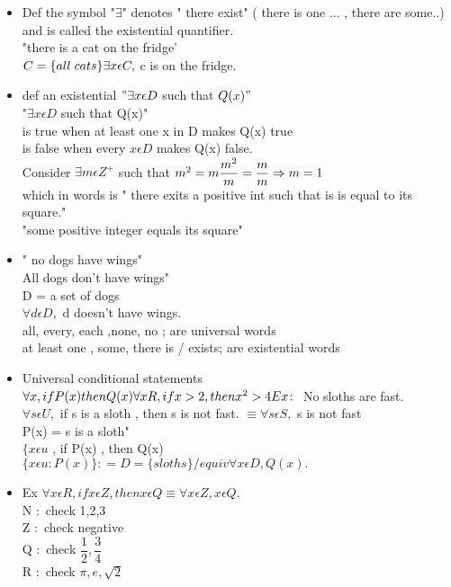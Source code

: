 \documentclass[10pt,letterpaper]{report}
\begin{document}
\begin{itemize}
\item Def the symbol "$\exists $" denotes " there exist" ( there is one ... , there are some..) and is called the existential quantifier. \\"there is a cat on the fridge' \\ $ C = \{all \; cats\} \\ \exists x \epsilon C , $ c is on the fridge. 
\item def an existential $" \exists x \epsilon D$ such that $ Q(x)"$ \\ "$ \exists x \epsilon D $ such that Q(x)" \\ is true when at least one x in D makes Q(x) true \\ is false when every $ x \epsilon D $ makes Q(x) false. \\ Consider $ \exists m \epsilon Z^+ $ such that $ m^2 = m  \\  \dfrac{m^2}{m}  = \dfrac{m}{m} \Rightarrow m = 1 $ \\ which in words is " there exits a positive int such that is is equal to its square." \\ "some positive integer equals its square"
\item " no dogs have wings" \\ All dogs don't have wings" \\ D = a set of dogs \\$ \forall d \epsilon D ,$ d doesn't have wings. \\ all, every, each ,none, no ; are universal words \\ at least one , some, there is / exists; are existential words 
\item Universal conditional statements \\ $\forall x , if P(x) then Q(x) \\ \forall x R , if x > 2, then x^2 > 4 \\ Ex \colon $ No sloths are fast. \\ $ \forall s \epsilon U ,$ if s is a sloth , then s is not fast. $\equiv  \forall s \epsilon S , $ s is not fast \\ P(x) = s is a sloth" \\ $ \{ x \epsilon u $ , if P(x) , then Q(x) \\ $ \{ x \epsilon u \colon P(x)\} \colon = D = \{sloths\} /equiv \forall x \epsilon D , Q(x).$ 
\item Ex $ \forall x \epsilon R , if x \epsilon Z, then x \epsilon Q \equiv  \forall x \epsilon Z , x \epsilon Q . $ \\ N $ \colon $ check 1,2,3 \\ Z $\colon $ check negative \\ Q $ \colon $  check $ \dfrac{1}{2}, \dfrac{3}{4}$ \\ R $ \colon $  check $ \pi , e , \sqrt{2} $ 

\end{itemize}
\end{document}
